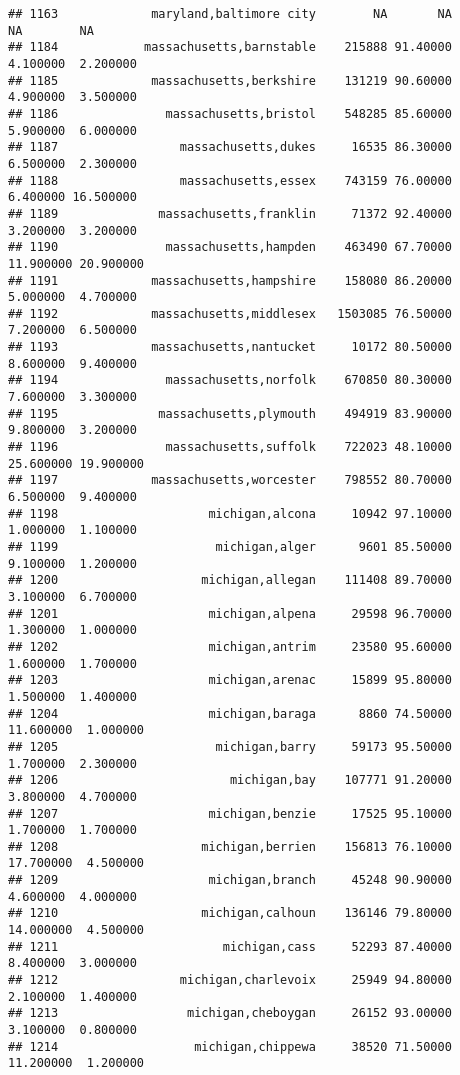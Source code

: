 \documentclass[
]{article}
\begin{document}
\begin{verbatim}
## 1163             maryland,baltimore city        NA       NA        NA        NA
## 1184            massachusetts,barnstable    215888 91.40000  4.100000  2.200000
## 1185             massachusetts,berkshire    131219 90.60000  4.900000  3.500000
## 1186               massachusetts,bristol    548285 85.60000  5.900000  6.000000
## 1187                 massachusetts,dukes     16535 86.30000  6.500000  2.300000
## 1188                 massachusetts,essex    743159 76.00000  6.400000 16.500000
## 1189              massachusetts,franklin     71372 92.40000  3.200000  3.200000
## 1190               massachusetts,hampden    463490 67.70000 11.900000 20.900000
## 1191             massachusetts,hampshire    158080 86.20000  5.000000  4.700000
## 1192             massachusetts,middlesex   1503085 76.50000  7.200000  6.500000
## 1193             massachusetts,nantucket     10172 80.50000  8.600000  9.400000
## 1194               massachusetts,norfolk    670850 80.30000  7.600000  3.300000
## 1195              massachusetts,plymouth    494919 83.90000  9.800000  3.200000
## 1196               massachusetts,suffolk    722023 48.10000 25.600000 19.900000
## 1197             massachusetts,worcester    798552 80.70000  6.500000  9.400000
## 1198                     michigan,alcona     10942 97.10000  1.000000  1.100000
## 1199                      michigan,alger      9601 85.50000  9.100000  1.200000
## 1200                    michigan,allegan    111408 89.70000  3.100000  6.700000
## 1201                     michigan,alpena     29598 96.70000  1.300000  1.000000
## 1202                     michigan,antrim     23580 95.60000  1.600000  1.700000
## 1203                     michigan,arenac     15899 95.80000  1.500000  1.400000
## 1204                     michigan,baraga      8860 74.50000 11.600000  1.000000
## 1205                      michigan,barry     59173 95.50000  1.700000  2.300000
## 1206                        michigan,bay    107771 91.20000  3.800000  4.700000
## 1207                     michigan,benzie     17525 95.10000  1.700000  1.700000
## 1208                    michigan,berrien    156813 76.10000 17.700000  4.500000
## 1209                     michigan,branch     45248 90.90000  4.600000  4.000000
## 1210                    michigan,calhoun    136146 79.80000 14.000000  4.500000
## 1211                       michigan,cass     52293 87.40000  8.400000  3.000000
## 1212                 michigan,charlevoix     25949 94.80000  2.100000  1.400000
## 1213                  michigan,cheboygan     26152 93.00000  3.100000  0.800000
## 1214                   michigan,chippewa     38520 71.50000 11.200000  1.200000

\end{verbatim}
\end{document}
